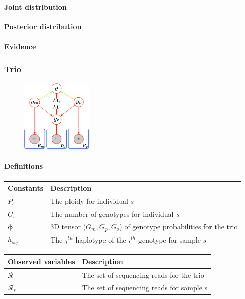 \documentclass{article}
\begin{document}
\paragraph{Joint distribution}

\paragraph{Posterior distribution}

\paragraph{Evidence}

\subsubsection{Trio}\label{model:trio}

\begin{figure}[ht]
    \centering
    \includegraphics[width=0.3\textwidth]{figures/trio_model}
\end{figure}

\paragraph{Definitions}

\begin{center}
\begin{tabular}{ll}
Constants & Description \\
\hline
$P_s$ & The ploidy for individual $s$ \\
$G_s$ & The number of genotypes for individual $s$ \\
$\boldsymbol{\phi}$ & 3D tensor ($G_m,G_p,G_o$) of genotype probabilities for the trio \\
$h_{sij}$ & The $j^{th}$ haplotype of the $i^{th}$ genotype for sample $s$ \\
\hline
\end{tabular}
\end{center}

\begin{center}
\begin{tabular}{ll}
Observed variables & Description \\
\hline
$\boldsymbol{\mathcal{R}}$ & The set of sequencing reads for the trio \\
$\mathcal{R}_s$ & The set of sequencing reads for sample s \\
\hline
\end{tabular}
\end{center}
\end{document}
